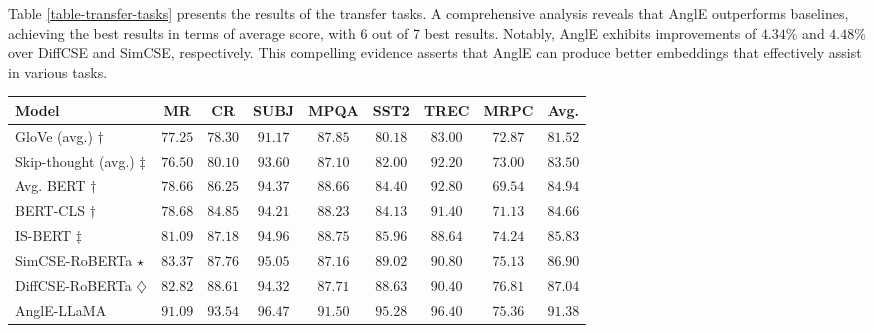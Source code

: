 \documentclass{article} \usepackage{iclr2024_conference,times}
\begin{document}
Table \ref{table-transfer-tasks} presents the results of the transfer tasks. A comprehensive analysis reveals that AnglE outperforms baselines, achieving the best results in terms of average score, with 6 out of 7 best results. Notably, AnglE exhibits improvements of $4.34\%$ and $4.48\%$ over DiffCSE and SimCSE, respectively. This compelling evidence asserts that AnglE can produce better embeddings that effectively assist in various tasks.

\begin{table*}[ht]
\small
\centering
\begin{threeparttable}
\begin{tabular}{lcccccccc}
\toprule
Model & MR & CR & SUBJ & MPQA & SST2 & TREC & MRPC & Avg. \\

\midrule
\midrule

GloVe (avg.) $\dagger$ & $77.25$ & $78.30$ &  $91.17$ &  $87.85$ & $80.18$ &  $83.00$ & $72.87$ &  $81.52$ \\ 
Skip-thought (avg.) $\ddagger$ & $76.50$ & $80.10$ & $93.60$ & $87.10$ &  $82.00$ & $92.20$ & $73.00$ & $83.50$ \\
\midrule

Avg. BERT $\dagger$ & $78.66$ & $86.25$ & $94.37$ & $88.66$ &  $84.40$ & $92.80$ & $69.54$ & $84.94$ \\

BERT-CLS $\dagger$ & $78.68$ & $84.85$ & $94.21$ & $88.23$ & $84.13$ & $91.40$ & $71.13$ & $84.66$ \\

IS-BERT $\ddagger$ & $81.09$ & $87.18$ & $94.96$ & $88.75$ & $85.96$  & $88.64$ & $74.24$ &  $85.83$ \\
\midrule

SimCSE-RoBERTa $\star$ & $83.37$ & $87.76$ & $95.05$ & $87.16$ & $89.02$ & $90.80$ & $75.13$ &  $86.90$ \\
DiffCSE-RoBERTa $\diamondsuit$ & $82.82$ & $88.61$ & $94.32$ & $87.71$ & $88.63$ & $90.40$ & $\mathbf{76.81}$ & $87.04$ \\

\midrule
AnglE-LLaMA & $\mathbf{91.09}$ & $\mathbf{93.54}$ & $\mathbf{96.47}$ & $\mathbf{91.50}$ & $\mathbf{95.28}$ & $\mathbf{96.40}$ & $75.36$ & $\mathbf{91.38}$ \\
\bottomrule

\end{tabular}
\end{threeparttable}
\caption{Transfer task results of different sentence embedding models (measured as accuracy). $\dagger$: results from \citet{sbert-nils-2019}; $\ddagger$: results from \citet{zhang-etal-2020-unsupervised}; $\star$: results from \citet{simcse_gao_2021}. $\diamondsuit$: results from \citet{chuang-etal-2022-diffcse}.}
\label{table-transfer-tasks}
\end{table*}
\end{document}
